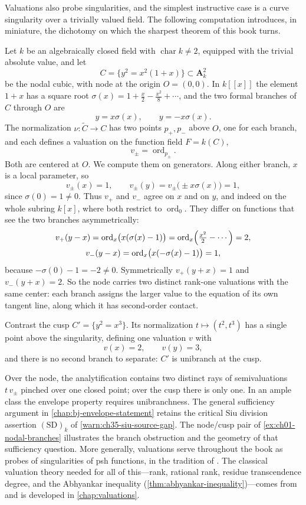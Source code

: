 Valuations also probe singularities, and the simplest instructive case is a
curve singularity over a trivially valued field.  The following computation
introduces, in miniature, the dichotomy on which the sharpest theorem of
this book turns.

\begin{example}
\label{ex:ch01-nodal-branches}
Let $k$ be an algebraically closed field with $\operatorname{char}k\neq2$,
equipped with the trivial absolute value, and let
\[
   C=\{y^2=x^2(1+x)\}\subset\mathbf A^2_k
\]
be the nodal cubic, with node at the origin $O=(0,0)$.  In $k[[x]]$ the
element $1+x$ has a square root
$\sigma(x)=1+\tfrac{x}{2}-\tfrac{x^2}{8}+\cdots$, and the two formal
branches of $C$ through $O$ are
\[
   y=x\sigma(x),\qquad y=-x\sigma(x).
\]
The normalization $\nu:\widetilde C\to C$ has two points $p_+,p_-$ above
$O$, one for each branch, and each defines a valuation on the function field
$F=k(C)$,
\[
   v_\pm=\operatorname{ord}_{p_\pm} .
\]
Both are centered at $O$.  We compute them on generators.  Along either
branch, $x$ is a local parameter, so
\[
   v_\pm(x)=1,\qquad v_\pm(y)=v_\pm\bigl(\pm x\sigma(x)\bigr)=1 ,
\]
since $\sigma(0)=1\ne0$.  Thus $v_+$ and $v_-$ agree on $x$ and on $y$, and
indeed on the whole subring $k[x]$, where both restrict to
$\operatorname{ord}_0$.  They differ on functions that see the two branches
asymmetrically:
\begin{gather*}
 v_+(y-x)=\operatorname{ord}_x\bigl(x(\sigma(x)-1)\bigr)
         =\operatorname{ord}_x\Bigl(\tfrac{x^2}{2}-\cdots\Bigr)=2,\\
 v_-(y-x)=\operatorname{ord}_x\bigl(x(-\sigma(x)-1)\bigr)=1,
\end{gather*}
because $-\sigma(0)-1=-2\neq0$.  Symmetrically $v_+(y+x)=1$ and
$v_-(y+x)=2$.  So the node carries two distinct rank-one valuations with the
same center: each branch assigns the larger value to the equation of its
own tangent line, along which it has second-order contact.

Contrast the cusp $C'=\{y^2=x^3\}$.  Its normalization
$t\mapsto(t^2,t^3)$ has a single point above the singularity, defining
one valuation $v$ with
\[
   v(x)=2,\qquad v(y)=3 ,
\]
and there is no second branch to separate: $C'$ is unibranch at the cusp.
\end{example}

Over the node, the analytification contains two distinct rays of
semivaluations $t\,v_\pm$ pinched over one closed point; over the cusp there
is only one.  In an ample class the envelope property requires
unibranchness. The general sufficiency argument in
\cref{chap:bj-envelope-statement} retains the critical Siu division
assertion $\mathrm{(SD)}_k$ of \cref{warn:ch35-siu-source-gap}.
The node/cusp pair of \cref{ex:ch01-nodal-branches} illustrates the
branch obstruction and the geometry of that sufficiency question. More generally,
valuations serve throughout the book as probes of singularities of psh
functions, in the tradition of \cite{BFJ08,JM12}.  The classical valuation
theory needed for all of this---rank, rational rank, residue transcendence
degree, and the Abhyankar inequality
(\cref{thm:abhyankar-inequality})---comes from \cite{ZariskiSamuelII} and is
developed in \cref{chap:valuations}.

